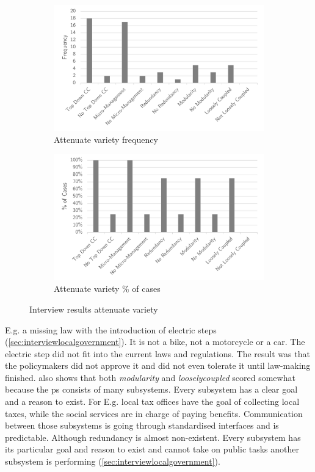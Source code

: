 \begin{figure}[H]
	\centering
	\begin{subfigure}[H]{0.5\textwidth}
		\centering
		\includegraphics[width=0.95\linewidth]{images/attenuate_frequency}
		\caption[Attenuate variety frequency]{Attenuate variety frequency}
		\label{fig:attenuatefrequency}
	\end{subfigure}%
	\begin{subfigure}[H]{0.5\textwidth}
		\centering
		\includegraphics[width=0.95\linewidth]{images/attenuate_cases}
		\caption[Attenuate variety \% of cases]{Attenuate variety \% of cases}
		\label{fig:attenuatecases}
	\end{subfigure}
	\caption[Interview results attenuate variety]{Interview results attenuate variety}
	\label{fig:interviewattenuatevariety}
\end{figure}
E.g. a missing law with the introduction of electric steps (\cref{sec:interviewlocalgovernment}). It is not a bike, not a motorcycle or a car. The electric step did not fit into the current laws and regulations. The result was that the policymakers did not approve it and did not even tolerate it until law-making finished.  also shows that both \textit{\gls{modularity}} and \textit{\gls{looselycoupled}} scored somewhat because the \gls{ps} consists of many subsystems. Every subsystem has a clear goal and a reason to exist. For E.g. local tax offices have the goal of collecting local taxes, while the social services are in charge of paying benefits. Communication between those subsystems is going through standardised interfaces and is predictable. Although \gls{redundancy} is almost non-existent. Every subsystem has its particular goal and reason to exist and cannot take on public tasks another subsystem is performing (\cref{sec:interviewlocalgovernment}).
